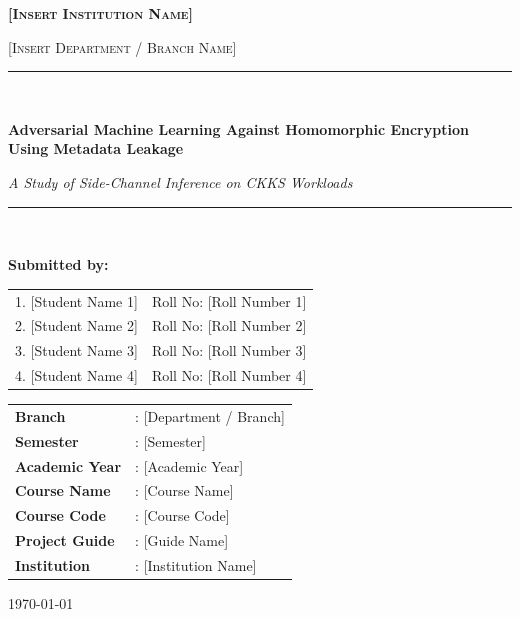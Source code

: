 \documentclass[12pt,a4paper]{article}
\begin{document}
\begin{titlepage}
\centering
\vspace*{0.4in}

{\scshape\large \textbf{[Insert Institution Name]} \par}
\vspace{0.1in}
{\scshape [Insert Department / Branch Name] \par}
\vspace{0.6in}

\rule{\textwidth}{0.6pt}\\[0.3in]
{\huge \bfseries Adversarial Machine Learning Against Homomorphic Encryption Using Metadata Leakage \par}
\vspace{0.2in}
{\large \textit{A Study of Side-Channel Inference on CKKS Workloads} \par}
\rule{\textwidth}{0.6pt}\\[0.6in]

\begin{flushleft}
\textbf{Submitted by:}\\[0.15in]
\begin{tabular}{ll}
1. [Student Name 1] & Roll No: [Roll Number 1] \\
2. [Student Name 2] & Roll No: [Roll Number 2] \\
3. [Student Name 3] & Roll No: [Roll Number 3] \\
4. [Student Name 4] & Roll No: [Roll Number 4] \\
\end{tabular}

\vspace{0.35in}
\begin{tabular}{ll}
\textbf{Branch}            & : [Department / Branch] \\
\textbf{Semester}          & : [Semester] \\
\textbf{Academic Year}     & : [Academic Year] \\
\textbf{Course Name}       & : [Course Name] \\
\textbf{Course Code}       & : [Course Code] \\
\textbf{Project Guide}     & : [Guide Name] \\
\textbf{Institution}       & : [Institution Name] \\
\end{tabular}
\end{flushleft}

\vfill
{\large \today}
\end{titlepage}
\end{document}
